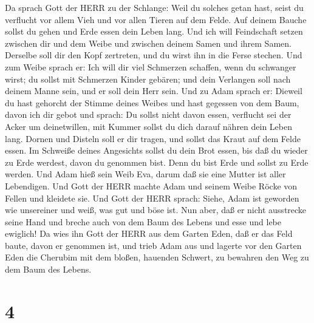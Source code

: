  Da sprach Gott der HERR zu der Schlange: Weil du solches
getan hast, seist du verflucht vor allem Vieh und vor allen Tieren auf
dem Felde. Auf deinem Bauche sollst du gehen und Erde essen dein Leben
lang.  Und ich will Feindschaft setzen zwischen dir und dem
Weibe und zwischen deinem Samen und ihrem Samen. Derselbe soll dir den
Kopf zertreten, und du wirst ihn in die Ferse stechen.  Und
zum Weibe sprach er: Ich will dir viel Schmerzen schaffen, wenn du
schwanger wirst; du sollst mit Schmerzen Kinder gebären; und dein
Verlangen soll nach deinem Manne sein, und er soll dein Herr sein.
 Und zu Adam sprach er: Dieweil du hast gehorcht der Stimme
deines Weibes und hast gegessen von dem Baum, davon ich dir gebot und
sprach: Du sollst nicht davon essen, verflucht sei der Acker um
deinetwillen, mit Kummer sollst du dich darauf nähren dein Leben lang.
 Dornen und Disteln soll er dir tragen, und sollst das
Kraut auf dem Felde essen.  Im Schweiße deines Angesichts
sollst du dein Brot essen, bis daß du wieder zu Erde werdest, davon du
genommen bist. Denn du bist Erde und sollst zu Erde werden.
 Und Adam hieß sein Weib Eva, darum daß sie eine Mutter ist
aller Lebendigen.  Und Gott der HERR machte Adam und seinem
Weibe Röcke von Fellen und kleidete sie.  Und Gott der HERR
sprach: Siehe, Adam ist geworden wie unsereiner und weiß, was gut und
böse ist. Nun aber, daß er nicht ausstrecke seine Hand und breche auch
von dem Baum des Lebens und esse und lebe ewiglich!  Da
wies ihn Gott der HERR aus dem Garten Eden, daß er das Feld baute, davon
er genommen ist,  und trieb Adam aus und lagerte vor den
Garten Eden die Cherubim mit dem bloßen, hauenden Schwert, zu bewahren
den Weg zu dem Baum des Lebens.

\hypertarget{section-3}{%
\section{4}\label{section-3}}

